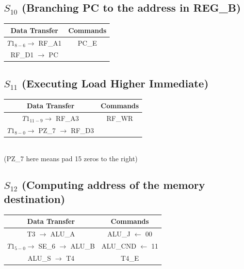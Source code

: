 \documentclass[]{report}
\begin{document}
        \subsection*{$S_{10}$ (Branching PC to the address in REG\_B)} %
        \begin{center}
            \begin{tabular}{|c|c|}
                \hline
                Data Transfer & Commands \\
                \hline
                $T1_{8-6} \to$ RF\_A1 & PC\_E\\
                RF\_D1 $\to$ PC & \\
                \hline
            \end{tabular}
        \end{center}
        \subsection*{$S_{11}$ (Executing Load Higher Immediate)} %
        \begin{center}
            \begin{tabular}{|c|c|}
                \hline
                Data Transfer & Commands \\
                \hline
                $T1_{11-9} \to$ RF\_A3 & RF\_WR\\
                $T1_{8-0} \to$ PZ\_7 $\to$ RF\_D3 & \\   %
                \hline
            \end{tabular}   \\
            (PZ\_7 here means pad 15 zeros to the right)
        \end{center}

        \subsection*{$S_{12}$ (Computing address of the memory destination)} %
        \begin{center}
            \begin{tabular}{|c|c|}
                \hline
                Data Transfer & Commands \\
                \hline
                T3 $\to$ ALU\_A & ALU\_J $\leftarrow$ 00\\
                $T1_{5-0} \to$ SE\_6 $\to$ ALU\_B & ALU\_CND $\leftarrow$ 11\\
                ALU\_S $\to$ T4 & T4\_E\\
                \hline
            \end{tabular}
        \end{center}
\end{document}
